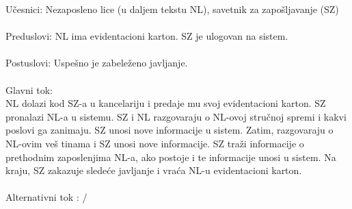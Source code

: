 \noindent U\v cesnici: Nezaposleno lice (u daljem tekstu NL), savetnik za zapo\v sljavanje (SZ)
\\
\\ Preduslovi: NL ima evidentacioni karton. SZ je ulogovan na sistem. 
\\
\\ Postuslovi: Uspe\v sno je zabele\v zeno javljanje.
\\ 
\\ Glavni tok:
\\ NL dolazi kod SZ-a u kancelariju i predaje mu svoj evidentacioni karton. SZ pronalazi NL-a u sistemu. SZ i NL razgovaraju o NL-ovoj stru\v cnoj spremi i kakvi poslovi ga zanimaju. SZ unosi nove informacije u sistem. Zatim, razgovaraju o NL-ovim ve\v s tinama i SZ unosi nove informacije. SZ tra\v zi informacije o prethodnim zaposlenjima NL-a, ako postoje i te informacije unosi u sistem. Na kraju, SZ zakazuje slede\' ce javljanje i vra\' ca NL-u evidentacioni karton.
\\
\\ Alternativni tok : /
